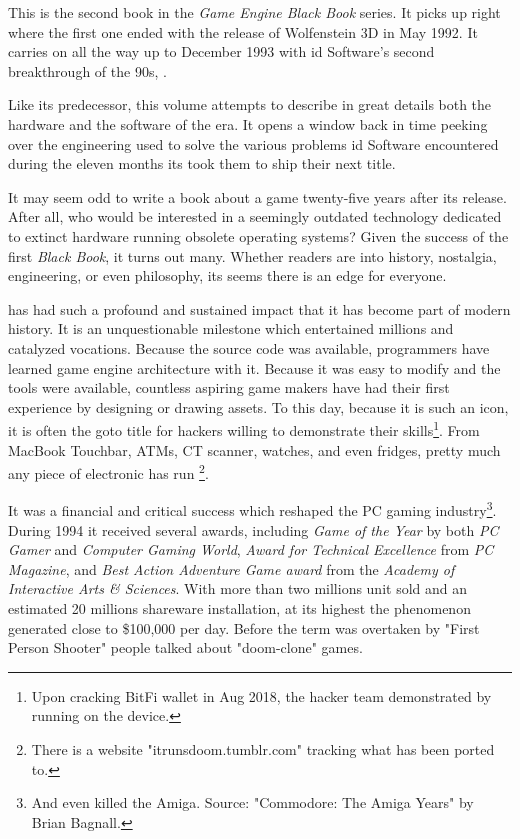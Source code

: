 This is the second book in the \textit{Game Engine Black Book} series. It picks up right where the first one ended with the release of Wolfenstein 3D in May 1992. It carries on all the way up to December 1993 with id Software's second breakthrough of the 90s, \doom{}.\\ %
\par
 Like its predecessor, this volume attempts to describe in great details both the hardware and the software of the era. It opens a window back in time peeking over the engineering used to solve the various problems id Software encountered during the eleven months its took them to ship their next title.\\%
\par
It may seem odd to write a book about a game twenty-five years after its release. After all, who would be interested in a seemingly outdated technology dedicated to extinct hardware running obsolete operating systems? Given the success of the first \textit{Black Book}, it turns out many. Whether readers are into history, nostalgia, engineering, or even philosophy, its seems there is an edge for everyone.\\ 

\par
\doom{} has had such a profound and sustained impact that it has become part of modern history. It is an unquestionable milestone which entertained millions and catalyzed vocations. Because the source code was available, programmers have learned game engine architecture with it. Because it was easy to modify and the tools were available, countless aspiring game makers have had their first experience by designing or drawing assets. To this day, because it is such an icon, it is often the goto title for hackers willing to demonstrate their skills\footnote{Upon cracking BitFi wallet in Aug 2018, the hacker team demonstrated by running \doom on the device.}. From MacBook Touchbar, ATMs, CT scanner, watches, and even fridges, pretty much any piece of electronic has run \doom{}\footnote{There is a website "itrunsdoom{}.tumblr.com" tracking what \doom{} has been ported to.}.\\
\par

It was a financial and critical success which reshaped the PC gaming industry\footnote{And even killed the Amiga. Source: "Commodore: The Amiga Years" by Brian Bagnall.}. During 1994 it received several awards, including \textit{Game of the Year} by both \textit{PC Gamer} and \textit{Computer Gaming World}, \textit{Award for Technical Excellence} from \textit{PC Magazine}, and \textit{Best Action Adventure Game award} from the \textit{Academy of Interactive Arts \& Sciences}. With more than two millions unit sold and an estimated 20 millions shareware installation, at its highest the phenomenon generated close to \$100,000 per day. Before the term was overtaken by "First Person Shooter" people talked about "doom{}-clone" games.\\
\par

